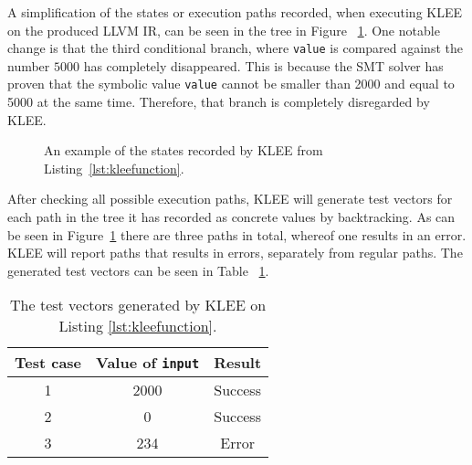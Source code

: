 A simplification of the states or execution paths recorded, when executing KLEE
on the produced LLVM IR, can be seen in the tree in Figure
~\ref{figure:kleetree}.  One notable change is that the third conditional
branch, where \texttt{value} is compared against the number $5000$ has
completely disappeared. This is because the SMT solver has proven that the
symbolic value \texttt{value} cannot be smaller than 2000 and equal to 5000 at
the same time.  Therefore, that branch is completely disregarded by KLEE\@.
\begin{figure}[h]
    \centering
    \caption{An example of the states recorded by KLEE from Listing~\ref{lst:kleefunction}.}
    \label{figure:kleetree}
\end{figure}
After checking all possible execution paths, KLEE will generate test vectors
for each path in the tree it has recorded as concrete values by backtracking.
As can be seen in Figure~\ref{figure:kleetree} there are three paths in total,
whereof one results in an error. KLEE will report paths that results in errors,
separately from regular paths. The generated test vectors can be seen in Table
~\ref{tab:kleeexample}.

\begin{table}[h]
    \centering
    \begin{tabular}{||c c c||}
        \hline
        Test case & Value of \texttt{input} & Result \\ [0.5ex]
        \hline\hline
        1 & 2000 & Success\\
        \hline
        2 & 0 & Success \\
        \hline
        3 & 234 & Error \\
        \hline
    \end{tabular}
    \caption{The test vectors generated by KLEE on Listing \ref{lst:kleefunction}.}
    \label{tab:kleeexample}
\end{table}

